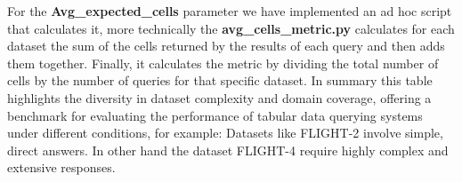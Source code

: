 \documentclass[12pt,a4paper]{article}
\begin{document}
For the \textbf{Avg\_expected\_cells} parameter we have implemented an ad hoc script that calculates it, more technically the \textbf{avg\_cells\_metric.py} calculates for each dataset the sum of the cells returned by the results of each query and then adds them together.
Finally, it calculates the metric by dividing the total number of cells by the number of queries for that specific dataset.
In summary this table  highlights the diversity in dataset complexity and domain coverage, offering a benchmark for evaluating the performance of tabular data querying systems under different conditions, for example: Datasets like FLIGHT-2 involve simple, direct answers.
In other hand the dataset FLIGHT-4  require highly complex and extensive responses.
\end{document}
